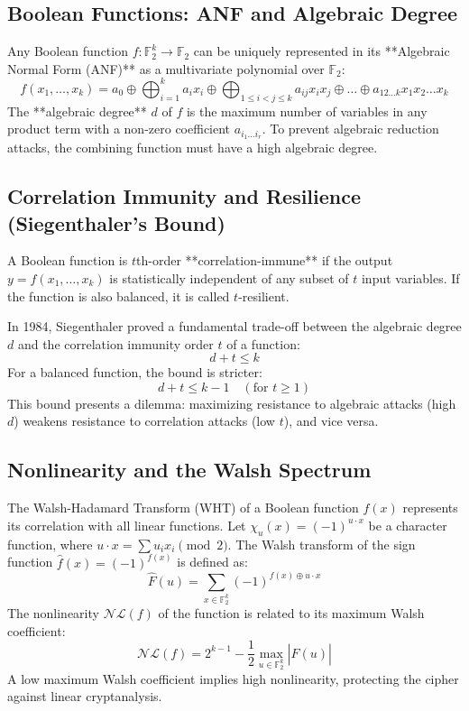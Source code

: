 \subsection{Boolean Functions: ANF and Algebraic Degree}
Any Boolean function $f: \mathbb{F}_2^k \to \mathbb{F}_2$ can be uniquely represented in its **Algebraic Normal Form (ANF)** as a multivariate polynomial over $\mathbb{F}_2$:
$$f(x_1, \dots, x_k) = a_0 \oplus \bigoplus_{i=1}^k a_i x_i \oplus \bigoplus_{1 \le i < j \le k} a_{ij} x_i x_j \oplus \dots \oplus a_{12\dots k} x_1 x_2 \dots x_k$$
The **algebraic degree** $d$ of $f$ is the maximum number of variables in any product term with a non-zero coefficient $a_{i_1\dots i_r}$. To prevent algebraic reduction attacks, the combining function must have a high algebraic degree.

\subsection{Correlation Immunity and Resilience (Siegenthaler's Bound)}
A Boolean function is $t$th-order **correlation-immune** if the output $y = f(x_1, \dots, x_k)$ is statistically independent of any subset of $t$ input variables. If the function is also balanced, it is called $t$-resilient.

In 1984, Siegenthaler proved a fundamental trade-off between the algebraic degree $d$ and the correlation immunity order $t$ of a function:
$$d + t \le k$$
For a balanced function, the bound is stricter:
$$d + t \le k - 1 \quad (\text{for } t \ge 1)$$
This bound presents a dilemma: maximizing resistance to algebraic attacks (high $d$) weakens resistance to correlation attacks (low $t$), and vice versa.

\subsection{Nonlinearity and the Walsh Spectrum}
The Walsh-Hadamard Transform (WHT) of a Boolean function $f(x)$ represents its correlation with all linear functions. Let $\chi_u(x) = (-1)^{u \cdot x}$ be a character function, where $u \cdot x = \sum u_i x_i \pmod{2}$. The Walsh transform of the sign function $\hat{f}(x) = (-1)^{f(x)}$ is defined as:
$$\hat{F}(u) = \sum_{x \in \mathbb{F}_2^k} (-1)^{f(x) \oplus u \cdot x}$$
The nonlinearity $\mathcal{NL}(f)$ of the function is related to its maximum Walsh coefficient:
$$\mathcal{NL}(f) = 2^{k-1} - \frac{1}{2} \max_{u \in \mathbb{F}_2^k} |\hat{F}(u)|$$
A low maximum Walsh coefficient implies high nonlinearity, protecting the cipher against linear cryptanalysis.

